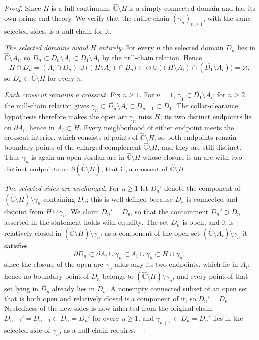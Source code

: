 \documentclass[11pt,reqno]{amsart}
\theoremstyle{definition}
\theoremstyle{remark}
\newcommand{\Chat}{\widehat{\mathbb C}}
\begin{document}
\begin{proof}
Since $H$ is a full continuum, $\Chat\setminus H$ is a simply connected
domain and has its own prime-end theory.  We verify that the entire chain
$(\gamma_n)_{n\ge1}$, with the same selected sides, is a null chain for
it.

\emph{The selected domains avoid $H$ entirely.}
For every $n$ the selected domain $D_n$ lies in $\Chat\setminus A_i$, so
$D_n\subset\overline{D_n}\setminus A_i\subset
\overline{D_1}\setminus A_i$ by the null-chain relation.
Hence
\[
H\cap D_n
=(A_i\cap D_n)\cup\bigl((H\setminus A_i)\cap D_n\bigr)
\subset\varnothing\cup
\bigl((H\setminus A_i)\cap(\overline{D_1}\setminus A_i)\bigr)
=\varnothing,
\]
so $D_n\subset\Chat\setminus H$ for every $n$.

\emph{Each crosscut remains a crosscut.}
Fix $n\ge1$.  For $n=1$,
$\gamma_1\subset\overline{D_1}\setminus A_i$; for $n\ge2$, the
null-chain relation gives
$\gamma_n\subset\overline{D_n}\setminus A_i\subset D_{n-1}\subset D_1$.
The collar-clearance hypothesis therefore makes the open arc
$\gamma_n$ miss $H$; its two distinct
endpoints lie on $\partial A_i$, hence in $A_i\subset H$.  Every
neighborhood of either endpoint meets the crosscut interior, which
consists of points of $\Chat\setminus H$, so both endpoints remain
boundary points of the enlarged complement $\Chat\setminus H$, and they
are still distinct.  Thus $\gamma_n$ is again an open Jordan arc in
$\Chat\setminus H$ whose closure is an arc with two distinct endpoints on
$\partial(\Chat\setminus H)$, that is, a crosscut of $\Chat\setminus H$.

\emph{The selected sides are unchanged.}
For $n\ge1$ let $D_n'$ denote the component of
$(\Chat\setminus H)\setminus\gamma_n$ containing $D_n$; this is
well defined because $D_n$ is connected and disjoint from
$H\cup\gamma_n$.  We claim $D_n'=D_n$, so that the containment
$D_n'\supset D_n$ asserted in the statement holds with equality.  The
set $D_n$ is open, and it is relatively closed in
$(\Chat\setminus H)\setminus\gamma_n$: as a component of the open set
$(\Chat\setminus A_i)\setminus\gamma_n$ it satisfies
\[
\partial D_n
\subset\partial A_i\cup\overline{\gamma_n}
\subset A_i\cup\gamma_n
\subset H\cup\gamma_n,
\]
since the closure of the open arc $\gamma_n$ adds only its two
endpoints, which lie in $A_i$; hence no boundary point of $D_n$ belongs
to $(\Chat\setminus H)\setminus\gamma_n$, and every point of that set
lying in $\overline{D_n}$ already lies in $D_n$.  A nonempty connected
subset of an open set that is both open and relatively closed is a
component of it, so $D_n'=D_n$.  Nestedness of the new sides is now
inherited from the original chain:
$D_{n+1}'=D_{n+1}\subset D_n=D_n'$ for every $n\ge1$, and
$\gamma_{n+1}\subset D_n=D_n'$ lies in the selected side of $\gamma_n$,
as a null chain requires.


\end{proof}
\end{document}
